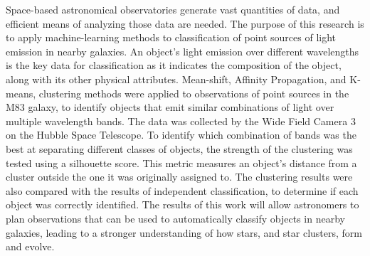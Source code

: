 Space-based astronomical observatories generate vast quantities of data, and efficient means of analyzing those data are needed.
The purpose of this research is to apply machine-learning methods to classification of point sources of light emission in nearby galaxies.
An object’s light emission over different wavelengths is the key data for classification as it indicates the composition of the object, along with its other physical attributes.
Mean-shift, Affinity Propagation, and K-means, clustering methods were applied to observations of point sources in the M83 galaxy, to identify objects that emit similar combinations of light over multiple wavelength bands.
The data was collected by the Wide Field Camera 3 on the Hubble Space Telescope.
To identify which combination of bands was the best at separating different classes of objects, the strength of the clustering was tested using a silhouette score.
This metric measures an object’s distance from a cluster outside the one it was originally assigned to.
The clustering results were also compared with the results of independent classification, to determine if each object was correctly identified.
The results of this work will allow astronomers to plan observations that can be used to automatically classify objects in nearby galaxies, leading to a stronger understanding of how stars, and star clusters, form and evolve. 